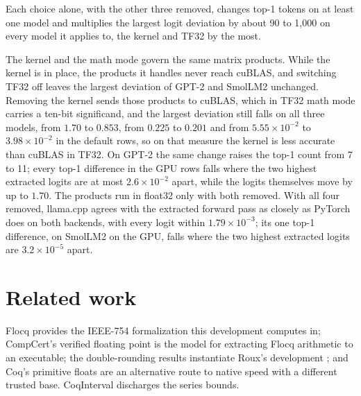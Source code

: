 \documentclass[11pt]{article}
\theoremstyle{plain}
\theoremstyle{definition}
\begin{document}
Each choice alone, with the other three removed, changes top-1 tokens on at
least one model and multiplies the largest logit deviation by about 90 to
1{,}000 on every model it applies to, the kernel and TF32 by the most.

The kernel and the math mode govern the same matrix products. While the kernel
is in place, the products it handles never reach cuBLAS, and switching TF32 off
leaves the largest deviation of GPT-2 and SmolLM2 unchanged. Removing the
kernel sends those products to cuBLAS, which in TF32 math mode carries a
ten-bit significand, and the largest deviation still falls on all three models,
from $1.70$ to $0.853$, from $0.225$ to $0.201$ and from $5.55\times10^{-2}$ to
$3.98\times10^{-2}$ in the default rows, so on that measure the kernel is less
accurate than cuBLAS in TF32. On GPT-2 the same change raises the top-1 count
from 7 to 11; every top-1 difference in the GPU rows falls where the two
highest extracted logits are at most $2.6\times10^{-2}$ apart, while the logits
themselves move by up to $1.70$. The products run in float32 only with both
removed. With all four removed, llama.cpp agrees with the extracted forward pass as closely as
PyTorch does on both backends, with every logit within $1.79\times10^{-3}$; its
one top-1 difference, on SmolLM2 on the GPU, falls where the two highest
extracted logits are $3.2\times10^{-5}$ apart.

\section{Related work}

Flocq \cite{flocq} provides the IEEE-754 formalization this development computes
in; CompCert's verified floating point \cite{compcertfp} is the model for
extracting Flocq arithmetic to an executable; the double-rounding results
instantiate Roux's development \cite{roux2014}; and Coq's primitive floats
\cite{primfloats} are an alternative route to native speed with a different
trusted base. CoqInterval \cite{coqinterval} discharges the series bounds.
\end{document}
